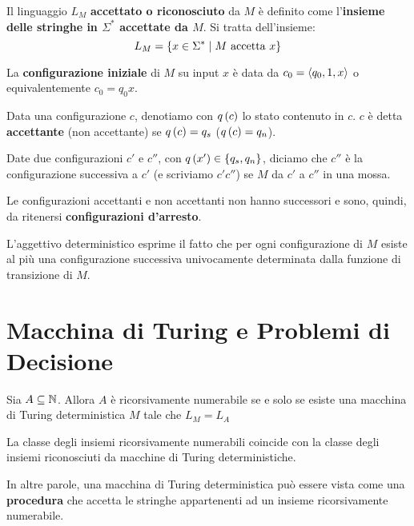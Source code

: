 \documentclass{lectures}
\begin{document}
\begin{multicols}{2}
    \begin{definition}
        Il linguaggio \(L_M\) \textbf{accettato o riconosciuto} da \(M\) è definito come l'\textbf{insieme delle stringhe in \(\Sigma^*\) accettate da \(M\)}. Si tratta dell'insieme:
        \[
            L_M = \left\{x \in \Sigma^* \mid M \text{ accetta }x\right\}
        \]
    \end{definition}
    \begin{definition}
        La \textbf{configurazione iniziale} di \(M\) su input \(x\) è data da \(c_0 = \left\langle q_0, 1, x\right\rangle\) o equivalentemente \(c_0 = q_0x\).
    \end{definition}
    \begin{definition}
        Data una configurazione \(c\), denotiamo con \(q\left(c\right)\) lo stato contenuto in \(c\). \(c\) è detta \textbf{accettante} (non accettante) se \(q\left(c\right) = q_s\) (\(q\left(c\right) = q_n\)).
    \end{definition}
    \begin{definition}
        Date due configurazioni \(c'\) e \(c''\), con \(q\left(x'\right) \in \left\{q_s, q_n\right\}\), diciamo  che \(c''\) è la configurazione successiva a \(c'\) (e scriviamo \(c' c''\)) se \(M\) da \(c'\) a \(c''\) in una mossa.
    \end{definition}
    \begin{definition}
        Le configurazioni accettanti e non accettanti non hanno successori e sono, quindi, da ritenersi \textbf{configurazioni d'arresto}.
    \end{definition}
    \begin{observation}
        L'aggettivo deterministico esprime il fatto che per ogni configurazione di \(M\) esiste al più una configurazione successiva univocamente determinata dalla funzione di transizione di \(M\).
        
    \end{observation}
\end{multicols}
\section{Macchina di Turing e Problemi di Decisione}
\begin{theorem}
    Sia \(A\subseteq \mathbb{N}\). Allora \(A\) è ricorsivamente numerabile se e solo se esiste una macchina di Turing deterministica \(M\) tale che \(L_M = L_A\)
    
    La classe degli insiemi ricorsivamente numerabili coincide con la classe degli insiemi riconosciuti da macchine di Turing deterministiche.
    
    In altre parole, una macchina di Turing deterministica può essere vista come una \textbf{procedura} che accetta le stringhe appartenenti ad un insieme ricorsivamente numerabile.
\end{theorem}
\end{document}
